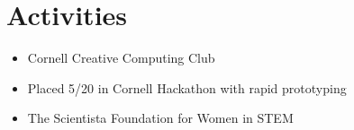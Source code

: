 \documentclass[letterpaper,10pt]{article}
\newcommand{\resumeSubHeadingListStart}{\begin{itemize}[leftmargin=*]}
\newcommand{\resumeSubHeadingListEnd}{\end{itemize}}
\newcommand{\shorterSection}[1]{\vspace{-10pt}\section{#1}}
\begin{document}
\shorterSection{Activities}
  \resumeSubHeadingListStart
  \item{Cornell Creative Computing Club}
  \vspace{-5pt}
    \item{Placed 5/20 in Cornell Hackathon with rapid prototyping}
    \vspace{-5pt}
    \item{The Scientista Foundation for Women in STEM}
  \resumeSubHeadingListEnd
\end{document}
